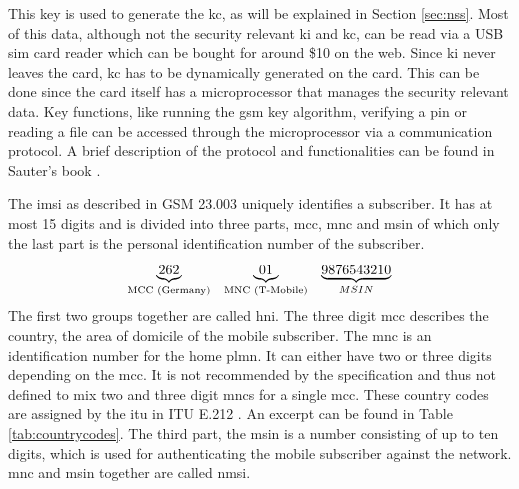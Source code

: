 This key is used to generate the \gls{kc}, as will be explained in Section \ref{sec:nss}.
Most of this data, although not the security relevant \gls{ki} and \gls{kc}, can be read via a USB \gls{sim} card reader which can be bought for around \$10 on the web.
Since \gls{ki} never leaves the card, \gls{kc} has to be dynamically generated on the card.
This can be done since the card itself has a microprocessor that manages the security relevant data.
Key functions, like running the \gls{gsm} key algorithm, verifying a \gls{pin} or reading a file can be accessed through the microprocessor via a communication protocol.
A brief description of the protocol and functionalities can be found in Sauter's book \cite{kommsys2006}.

The \gls{imsi} as described in GSM 23.003 \cite{GSM23003} uniquely identifies a subscriber.
It has at most 15 digits and is divided into three parts, \gls{mcc}, \gls{mnc} and \gls{msin} of which only the last part is the personal identification number of the subscriber.
\[\underbrace{262}_{\text{MCC (Germany)}} \underbrace{01}_{\text{\phantom{aa}MNC (T-Mobile)\phantom{aa}}} \underbrace{9876543210}_{MSIN}\]
The first two groups together are called \gls{hni}.
The three digit \gls{mcc} describes the country, the area of domicile of the mobile subscriber.
The \gls{mnc} is an identification number for the home \gls{plmn}.
It can either have two or three digits depending on the \gls{mcc}.
It is not recommended by the specification and thus not defined to mix two and three digit \gls{mnc}s for a single \gls{mcc}.
These country codes are assigned by the \gls{itu} in ITU E.212 \cite{ITU212}.
An excerpt can be found in Table \ref{tab:countrycodes}.
The third part, the \gls{msin} is a number consisting of up to ten digits, which is used for authenticating the mobile subscriber against the network.
\gls{mnc} and \gls{msin} together are called \gls{nmsi}.
